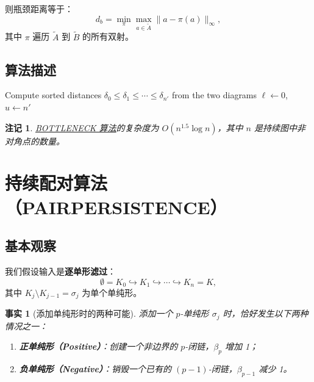 \documentclass[UTF8]{ctexart}
\newtheorem{remark}[definition]{注记}
\newtheorem{fact}[definition]{事实}
\begin{document}
则瓶颈距离等于：
\[
d_b = \min_{\pi} \max_{a \in \tilde{A}} \|a - \pi(a)\|_\infty,
\]
其中 \(\pi\) 遍历 \(\tilde{A}\) 到 \(\tilde{B}\) 的所有双射。

\subsection{算法描述}

\begin{algorithm}[htbp]
\caption{BOTTLENECK}
\label{alg:bottleneck}
Compute sorted distances $\delta_0 \le \delta_1 \le \cdots \le \delta_{n'}$ from the two diagrams\;
$\ell \leftarrow 0$, $u \leftarrow n'$\;
\Return{$\delta$}
\end{algorithm}

\begin{remark}
\hyperref[alg:bottleneck]{BOTTLENECK 算法}的复杂度为 \(O(n^{1.5}\log n)\)，其中 \(n\) 是持续图中非对角点的数量。
\end{remark}

\section{持续配对算法（PAIRPERSISTENCE）}
\label{sec:pairpersistence}

\subsection{基本观察}

我们假设输入是\textbf{逐单形滤过}：
\[
\emptyset = K_0 \hookrightarrow K_1 \hookrightarrow \cdots \hookrightarrow K_n = K,
\]
其中 \(K_j \setminus K_{j-1} = \sigma_j\) 为单个单纯形。

\begin{fact}[添加单纯形时的两种可能]
\label{fact:positive-negative}
添加一个 \(p\)-单纯形 \(\sigma_j\) 时，恰好发生以下两种情况之一：
\begin{enumerate}
    \item \textbf{正单纯形（Positive）}：创建一个非边界的 \(p\)-闭链，\(\beta_p\) 增加 1；
    \item \textbf{负单纯形（Negative）}：销毁一个已有的 \((p-1)\)-闭链，\(\beta_{p-1}\) 减少 1。
\end{enumerate}
\end{fact}
\end{document}
